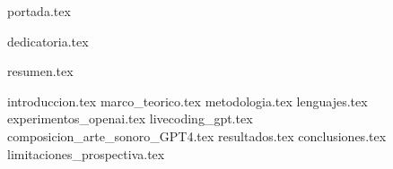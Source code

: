 
\renewcommand{\BOthers}[1]{et al.\hbox{}} %
\renewcommand{\BOthersPeriod}[1]{et al.\hbox{}}
\renewcommand{\BMTh}{Trabajo de fin de máster}
\renewcommand{\BAvailFrom}{Disponible en\ }
\renewcommand{\BRetrieved}[1]{Recuperado {#1}, de\ }
\renewcommand{\BRetrievedFrom}{Disponible en\ }



  {portada.tex}
  \setcounter{page}{2} %


  \clearpage

  \thispagestyle{empty} 
  {dedicatoria.tex}
  \clearpage
  \thispagestyle{empty} 
  
  \pagestyle{fancy} 

  {resumen.tex}
  \clearpage
  

  \tableofcontents
  \clearpage

  \listoffigures 
  \clearpage

  \listoftables
  \clearpage

  \label{chap:glosario}
  \printglossary[title=Índice de acrónimos, toctitle=Índice de acrónimos]
  \clearpage

  \setcounter{inicioContenido}{\value{page}}

  {introduccion.tex}
  {marco_teorico.tex}
  {metodologia.tex}
  {lenguajes.tex}
  {experimentos_openai.tex}
  {livecoding_gpt.tex}
  {composicion_arte_sonoro_GPT4.tex}
  {resultados.tex}
  {conclusiones.tex}
  {limitaciones_prospectiva.tex}

